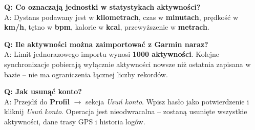 \documentclass[12pt,a4paper]{report}
\begin{document}
\vspace{0.5em}
\textbf{Q: Co oznaczają jednostki w statystykach aktywności?} \\
A: Dystans podawany jest w \textbf{kilometrach}, czas w \textbf{minutach}, prędkość w \textbf{km/h}, tętno w \textbf{bpm}, kalorie w \textbf{kcal}, przewyższenie w \textbf{metrach}.

\vspace{0.5em}
\textbf{Q: Ile aktywności można zaimportować z Garmin naraz?} \\
A: Limit jednorazowego importu wynosi \textbf{1000 aktywności}. Kolejne synchronizacje pobierają wyłącznie aktywności nowsze niż ostatnia zapisana w bazie -- nie ma ograniczenia łącznej liczby rekordów.

\vspace{0.5em}
\textbf{Q: Jak usunąć konto?} \\
A: Przejdź do \textbf{Profil} $\to$ sekcja \textit{Usuń konto}. Wpisz hasło jako potwierdzenie i kliknij \textit{Usuń konto}. Operacja jest nieodwracalna -- zostaną usunięte wszystkie aktywności, dane trasy GPS i historia logów.

\end{document}
